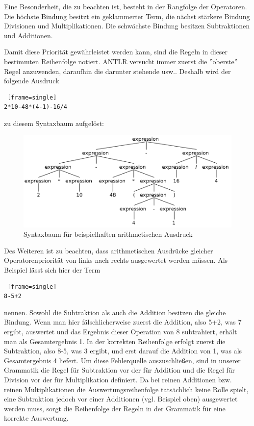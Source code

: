 Eine Besonderheit, die zu beachten ist, besteht in der Rangfolge der Operatoren. Die höchste Bindung besitzt ein geklammerter Term, die nächst stärkere Bindung Divisionen und Multiplikationen. Die schwächste Bindung besitzen Subtraktionen und Additionen.

Damit diese Priorität gewährleistet werden kann, sind die Regeln in dieser bestimmten Reihenfolge notiert. ANTLR versucht immer zuerst die ''oberste'' Regel anzuwenden, daraufhin die darunter stehende usw.. Deshalb wird der folgende Ausdruck 

\begin{lstlisting} [frame=single]
2*10-48*(4-1)-16/4
\end{lstlisting}

zu diesem Syntaxbaum aufgelöst:

\begin{figure}[h!]
\centering
\includegraphics[scale=0.4]{pics/antlr4_parse_tree_arithmetic.png}
\caption{Syntaxbaum für beispielhaften arithmetischen Ausdruck}
\end{figure}

Des Weiteren ist zu beachten, dass arithmetischen Ausdrücke gleicher Operatorenpriorität von links  nach rechts ausgewertet werden müssen. Als Beispiel lässt sich hier der Term 
\begin{lstlisting} [frame=single]
8-5+2
\end{lstlisting}
nennen. Sowohl die Subtraktion als auch die Addition besitzen die gleiche Bindung. Wenn man hier fälschlicherweise zuerst die Addition, also 5+2, was 7 ergibt, auswertet und das Ergebnis dieser Operation von 8 subtrahiert, erhält man als Gesamtergebnis 1. 
In der korrekten Reihenfolge erfolgt zuerst die Subtraktion, also 8-5, was 3 ergibt, und erst darauf die Addition von 1, was als Gesamtergebnis 4 liefert. 
Um diese Fehlerquelle auszuschließen, sind in unserer Grammatik die Regel für Subtraktion vor der für Addition und die Regel für Division vor der für Multiplikation definiert. Da bei reinen Additionen bzw. reinen Multiplikationen die Auswertungsreihenfolge tatsächlich keine Rolle spielt, eine Subtraktion jedoch vor einer Additionen (vgl. Beispiel oben) ausgewertet werden muss, sorgt die Reihenfolge der Regeln in der Grammatik für eine korrekte Auswertung.


